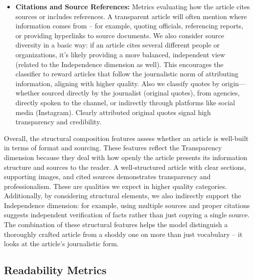 \begin{itemize}
  \item \textbf{Citations and Source References:} Metrics evaluating how the article cites sources or includes references. A transparent article will often mention where information comes from – for example, quoting officials, referencing reports, or providing hyperlinks to source documents. We also consider source diversity in a basic way: if an article cites several different people or organizations, it’s likely providing a more balanced, independent view (related to the Independence dimension as well). This encourages the classifier to reward articles that follow the journalistic norm of attributing information, aligning with higher quality. Also we classify quotes by origin—whether sourced directly by the journalist (original quotes), from agencies, directly spoken to the channel, or indirectly through platforms like social media (Instagram). Clearly attributed original quotes signal high transparency and credibility.
\end{itemize}

Overall, the structural composition features assess whether an article is well-built in terms of format and sourcing. These features reflect the Transparency dimension because they deal with how openly the article presents its information structure and sources to the reader. A well-structured article with clear sections, supporting images, and cited sources demonstrates transparency and professionalism. These are qualities we expect in higher quality categories. Additionally, by considering structural elements, we also indirectly support the Independence dimension: for example, using multiple sources and proper citations suggests independent verification of facts rather than just copying a single source. The combination of these structural features helps the model distinguish a thoroughly crafted article from a shoddy one on more than just vocabulary – it looks at the article’s journalistic form.

\subsection{Readability Metrics}


